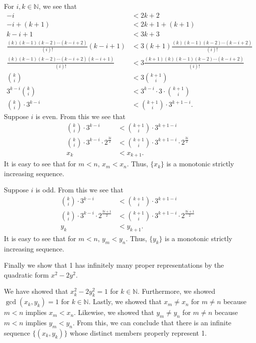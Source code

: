 \documentclass[12 pt]{amsart}
\begin{document}
  For $i,k \in \mathbb{N}$, we see that
  \begin{align*}
    -i &< 2k + 2 \\
    -i + (k + 1) &< 2k+1 + (k + 1) \\
    k - i + 1 &< 3k + 3 \\
    \frac{(k)(k-1)(k-2)\cdots(k-i+2)}{(i)!} (k-i+1)
      &< 3(k+1)\frac{(k)(k-1)(k-2)\cdots(k-i+2)}{(i)!} \\
    \frac{(k)(k-1)(k-2)\cdots(k-i+2)(k-i+1)}{(i)!}
      &< 3\frac{(k+1)(k)(k-1)(k-2)\cdots(k-i+2)}{(i)!} \\
    \binom{k}{i}
      &< 3\binom{k+1}{i} \\
    3^{k-i}\binom{k}{i}
      &< 3^{k-i} \cdot 3 \cdot \binom{k+1}{i} \\
    \binom{k}{i}\cdot 3^{k-i}
      &< \binom{k+1}{i}\cdot 3^{k+1-i}.
  \end{align*}
  Suppose $i$ is even.
  From this we see that 
  \begin{align*}
    \binom{k}{i}\cdot 3^{k-i}
      &< \binom{k+1}{i}\cdot 3^{k+1-i} \\
    \binom{k}{i}\cdot 3^{k-i} \cdot 2^{\frac{3i}{2}}
      &< \binom{k+1}{i}\cdot 3^{k+1-i} \cdot 2^{\frac{3i}{2}} \\
    x_k &< x_{k+1}.
  \end{align*}
  It is easy to see that for $m < n$, $x_m < x_n$.
  Thus, $\{x_k\}$ is a monotonic strictly increasing sequence.

  Suppose $i$ is odd.
  From this we see that 
  \begin{align*}
    \binom{k}{i}\cdot 3^{k-i}
      &< \binom{k+1}{i}\cdot 3^{k+1-i} \\
    \binom{k}{i}\cdot 3^{k-i} \cdot 2^{\frac{3i+1}{2}}
      &< \binom{k+1}{i}\cdot 3^{k+1-i} \cdot 2^{\frac{3i+1}{2}} \\
    y_k &< y_{k+1}.
  \end{align*}
  It is easy to see that for $m < n$, $y_m < y_n$.
  Thus, $\{y_k\}$ is a monotonic strictly increasing sequence.

  Finally we show that 1 has infinitely many proper
  representations by the quadratic form $x^2 - 2y^2$.

  We have showed that $x^2_k - 2y^2_k = 1$ for 
  $k \in \mathbb{N}$.
  Furthermore, we showed $\gcd(x_k, y_k) = 1$ for 
  $k \in \mathbb{N}$.
  Lastly, we showed that
  $x_m \neq x_n$ for $m \neq n$ because $m < n$ implies $x_m < x_n$.
  Likewise, we showed that
  $y_m \neq y_n$ for $m \neq n$ because $m < n$ implies $y_m < y_n$.
  From this, we can conclude that there is an infinite 
  sequence $\{(x_k, y_k)\}$ whose distinct members properly
  represent 1. 
\vfill
\newpage
\end{document}
